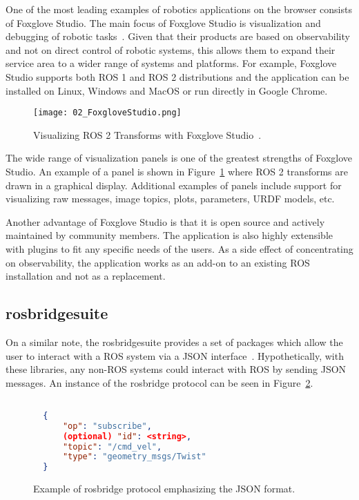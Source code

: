         One of the most leading examples of robotics applications on the browser consists of Foxglove Studio. The main focus of Foxglove Studio is visualization and debugging of robotic tasks~\cite{foxglove}. Given that their products are based on observability and not on direct control of robotic systems, this allows them to expand their service area to a wider range of systems and platforms. For example, Foxglove Studio supports both \ac{ROS} 1 and \ac{ROS} 2 distributions and the application can be installed on Linux, Windows and MacOS or run directly in Google Chrome.
        
        \begin{figure}[htbp]
            \centering
            \texttt{[image: 02\_FoxgloveStudio.png]}
            \caption{Visualizing ROS 2 Transforms with Foxglove Studio~\cite{transforms}.}
            \label{fig:foxglove}
        \end{figure}

        The wide range of visualization panels is one of the greatest strengths of Foxglove Studio. An example of a panel is shown in Figure~\ref{fig:foxglove} where \ac{ROS} 2 transforms are drawn in a graphical display. Additional examples of panels include support for visualizing raw messages, image topics, plots, parameters, \ac{URDF} models, etc.

        Another advantage of Foxglove Studio is that it is open source and actively maintained by community members. The application is also highly extensible with plugins to fit any specific needs of the users. As a side effect of concentrating on observability, the application works as an add-on to an existing ROS installation and not as a replacement.

    \subsection{rosbridge\smallunderscore  suite}

        On a similar note, the \textsf{rosbridge\smallunderscore  suite} provides a set of packages which allow the user to interact with a \ac{ROS} system via a \ac{JSON} interface~\cite{rosbridge}. Hypothetically, with these libraries, any non-ROS systems could interact with ROS by sending \ac{JSON} messages. An instance of the \textsf{rosbridge} protocol can be seen in Figure~\ref{fig:rosbridge}.

        \begin{figure}[htbp]
            \centering
            \begin{lstlisting}[language=JSON]

  {
      "op": "subscribe",
      (optional) "id": <string>,
      "topic": "/cmd_vel",
      "type": "geometry_msgs/Twist"
  }
            \end{lstlisting}
            \caption{Example of \textsf{rosbridge} protocol emphasizing the JSON format.}
            \label{fig:rosbridge}
        \end{figure}

